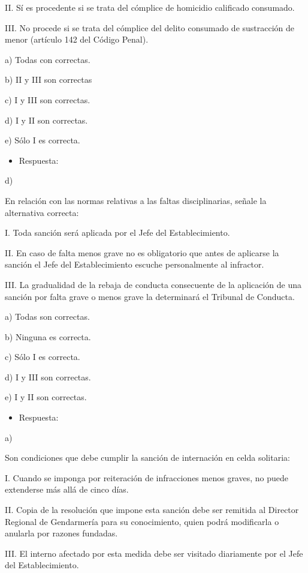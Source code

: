 \documentclass[letterpaper, 11pt]{article}
\begin{document}
II. Sí es procedente si se trata del cómplice de homicidio calificado consumado.

III. No procede si se trata del cómplice del delito consumado de sustracción de menor
(artículo 142 del Código Penal).

a) Todas con correctas.

b) II y III son correctas

c) I y III son correctas.

d) I y II son correctas.

e) Sólo I es correcta.

\begin{itemize}
\item Respuesta:
\end{itemize}
d)


En relación con las normas relativas a las faltas disciplinarias, señale la alternativa
correcta:

I. Toda sanción será aplicada por el Jefe del Establecimiento.

II. En caso de falta menos grave no es obligatorio que antes de aplicarse la sanción el
Jefe del Establecimiento escuche personalmente al infractor.

III. La gradualidad de la rebaja de conducta consecuente de la aplicación de una
sanción por falta grave o menos grave la determinará el Tribunal de Conducta.

a) Todas son correctas.

b) Ninguna es correcta.

c) Sólo I es correcta.

d) I y III son correctas.

e) I y II son correctas.

\begin{itemize}
\item Respuesta:
\end{itemize}
a)

Son condiciones que debe cumplir la sanción de internación en celda solitaria:

I. Cuando se imponga por reiteración de infracciones menos graves, no puede
extenderse más allá de cinco días.

II. Copia de la resolución que impone esta sanción debe ser remitida al Director
Regional de Gendarmería para su conocimiento, quien podrá modificarla o anularla
por razones fundadas.

III. El interno afectado por esta medida debe ser visitado diariamente por el Jefe del
Establecimiento.
\end{document}
